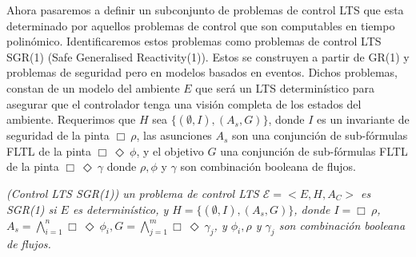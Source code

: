 Ahora pasaremos a definir un subconjunto de problemas de control LTS que esta determinado por aquellos problemas de
control que son computables en tiempo polinómico. Identificaremos estos problemas como problemas de control LTS SGR(1)
(Safe Generalised Reactivity(1)). Estos se construyen a partir de GR(1) y problemas de seguridad pero en modelos basados
en eventos. Dichos problemas, constan de un modelo del ambiente $E$ que será un LTS determinístico para asegurar que el
controlador tenga una visión completa de los estados del ambiente. Requerimos que $H$ sea $\{(\emptyset,I),(A_s,G)\}$,
donde $I$ es un invariante de seguridad de la pinta $\Box\ \rho$, las asunciones $A_s$ son una conjunción de sub-fórmulas
FLTL de la pinta $\Box\ \Diamond\ \phi$, y el objetivo $G$ una conjunción de sub-fórmulas FLTL de la pinta $\Box\ \Diamond\ \gamma$
donde $\rho,\phi$ y $\gamma$ son combinación booleana de flujos.

\begin{nahaDef}\label{ControlLTSSGR1}
    \emph{(Control LTS SGR(1)) un problema de control LTS $\mathcal{E} = <E,H,A_C>$ es SGR(1) si $E$ es
    determinístico, y $H = \{(\emptyset,I),(A_s,G)\}$, donde $I = \Box\ \rho$, $A_s = \bigwedge_{i=1}^{n}
    \Box\ \Diamond\ \phi_i, G = \bigwedge_{j=1}^{m}\Box\ \Diamond\ \gamma_j$, y $\phi_i, \rho$ y $\gamma_j$ son combinación
    booleana de flujos.}
\end{nahaDef}

